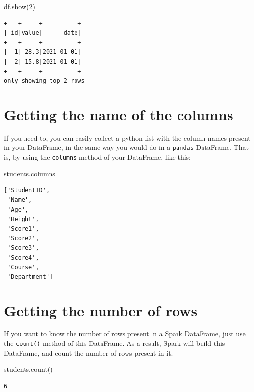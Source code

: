 \documentclass[
  11pt,
  letterpaper,
  DIV=11,
  numbers=noendperiod]{scrreprt}
\newenvironment{Shaded}{\begin{snugshade}}{\end{snugshade}}
\newcommand{\DecValTok}[1]{\textcolor[rgb]{0.68,0.00,0.00}{#1}}
\newcommand{\NormalTok}[1]{\textcolor[rgb]{0.00,0.23,0.31}{#1}}
\begin{document}
\begin{Shaded}
\begin{Highlighting}[]
\NormalTok{df.show(}\DecValTok{2}\NormalTok{)}
\end{Highlighting}
\end{Shaded}

\begin{verbatim}
+---+-----+----------+
| id|value|      date|
+---+-----+----------+
|  1| 28.3|2021-01-01|
|  2| 15.8|2021-01-01|
+---+-----+----------+
only showing top 2 rows
\end{verbatim}

\section{Getting the name of the
columns}\label{getting-the-name-of-the-columns}

If you need to, you can easily collect a python list with the column
names present in your DataFrame, in the same way you would do in a
\texttt{pandas} DataFrame. That is, by using the \texttt{columns} method
of your DataFrame, like this:

\begin{Shaded}
\begin{Highlighting}[]
\NormalTok{students.columns}
\end{Highlighting}
\end{Shaded}

\begin{verbatim}
['StudentID',
 'Name',
 'Age',
 'Height',
 'Score1',
 'Score2',
 'Score3',
 'Score4',
 'Course',
 'Department']
\end{verbatim}

\section{Getting the number of rows}\label{getting-the-number-of-rows}

If you want to know the number of rows present in a Spark DataFrame,
just use the \texttt{count()} method of this DataFrame. As a result,
Spark will build this DataFrame, and count the number of rows present in
it.

\begin{Shaded}
\begin{Highlighting}[]
\NormalTok{students.count()}
\end{Highlighting}
\end{Shaded}

\begin{verbatim}
6
\end{verbatim}
\end{document}
